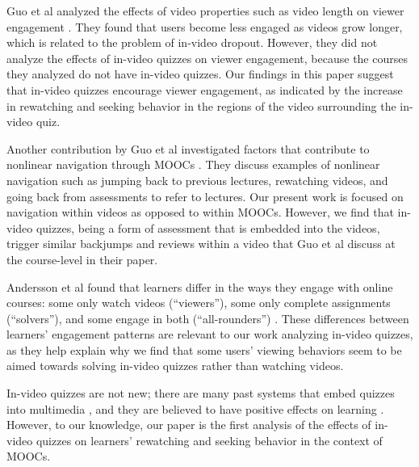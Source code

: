 \documentclass{sigchi}
\begin{document}
Guo et al analyzed the effects of video properties such as video length on viewer engagement \cite{guovideo}. They found that users become less engaged as videos grow longer, which is related to the problem of in-video dropout. However, they did not analyze the effects of in-video quizzes on viewer engagement, because the courses they analyzed do not have in-video quizzes. Our findings in this paper suggest that in-video quizzes encourage viewer engagement, as indicated by the increase in rewatching and seeking behavior in the regions of the video surrounding the in-video quiz.

Another contribution by Guo et al investigated factors that contribute to nonlinear navigation through MOOCs \cite{guodemographics}. They discuss examples of nonlinear navigation such as jumping back to previous lectures, rewatching videos, and going back from assessments to refer to lectures. Our present work is focused on navigation within videos as opposed to within MOOCs. However, we find that in-video quizzes, being a form of assessment that is embedded into the videos, trigger similar backjumps and reviews within a video that Guo et al discuss at the course-level in their paper.

Andersson et al found that learners differ in the ways they engage with online courses: some only watch videos (``viewers''), some only complete assignments (``solvers''), and some engage in both (``all-rounders'') \cite{ashton}. These differences between learners' engagement patterns are relevant to our work analyzing in-video quizzes, as they help explain why we find that some users' viewing behaviors seem to be aimed towards solving in-video quizzes rather than watching videos.


In-video quizzes are not new; there are many past systems that embed quizzes into multimedia \cite{multimedia}, and they are believed to have positive effects on learning \cite{embedded}. However, to our knowledge, our paper is the first analysis of the effects of in-video quizzes on learners' rewatching and seeking behavior in the context of MOOCs.
\end{document}
